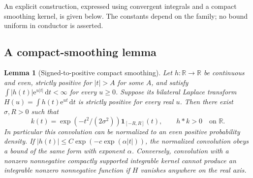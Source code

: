\documentclass[11pt]{article}
\newtheorem{lemma}[theorem]{Lemma}
\theoremstyle{remark}\newtheorem{remark}[theorem]{Remark}
\newcommand{\R}{\mathbb R}\newcommand{\C}{\mathbb C}\newcommand{\dd}{\,\mathrm d}
\newcommand{\ee}{\mathrm e}\newcommand{\abs}[1]{\lvert#1\rvert}
\begin{document}
An explicit construction, expressed using convergent integrals and a compact smoothing kernel, is given below. The constants depend on the family; no bound uniform in conductor is asserted.

\subsection{A compact-smoothing lemma}
\begin{lemma}[Signed-to-positive compact smoothing]\label{lem:smooth}
Let $h:\R\to\R$ be continuous and even, strictly positive for $|t|>A$ for some $A$, and satisfy $\int |h(t)|\ee^{u|t|}\dd t<\infty$ for every $u\ge0$. Suppose its bilateral Laplace transform $H(u)=\int h(t)\ee^{ut}\dd t$ is strictly positive for every real $u$. Then there exist $\sigma,R>0$ such that
\[
 k(t)=\exp(-t^2/(2\sigma^2))\mathbf1_{[-R,R]}(t),\qquad h*k>0\quad\text{on }\R.
\]
In particular this convolution can be normalized to an even positive probability density. If $|h(t)|\le C\exp(-c\exp(\alpha |t|))$, the normalized convolution obeys a bound of the same form with exponent $\alpha$. Conversely, convolution with a nonzero nonnegative compactly supported integrable kernel cannot produce an integrable nonzero nonnegative function if $H$ vanishes anywhere on the real axis.
\end{lemma}
\end{document}

